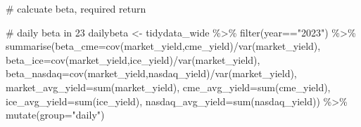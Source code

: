 \documentclass[
  letterpaper,
  DIV=11,
  numbers=noendperiod]{scrreprt}
\newenvironment{Shaded}{\begin{snugshade}}{\end{snugshade}}
\newcommand{\AttributeTok}[1]{\textcolor[rgb]{0.40,0.45,0.13}{#1}}
\newcommand{\CommentTok}[1]{\textcolor[rgb]{0.37,0.37,0.37}{#1}}
\newcommand{\FunctionTok}[1]{\textcolor[rgb]{0.28,0.35,0.67}{#1}}
\newcommand{\NormalTok}[1]{\textcolor[rgb]{0.00,0.23,0.31}{#1}}
\newcommand{\OtherTok}[1]{\textcolor[rgb]{0.00,0.23,0.31}{#1}}
\newcommand{\SpecialCharTok}[1]{\textcolor[rgb]{0.37,0.37,0.37}{#1}}
\newcommand{\StringTok}[1]{\textcolor[rgb]{0.13,0.47,0.30}{#1}}
\begin{document}
\begin{Shaded}
\begin{Highlighting}[]
\CommentTok{\# calcuate beta, required return}

\CommentTok{\# daily beta in \textquotesingle{}23}
\NormalTok{dailybeta }\OtherTok{\textless{}{-}}\NormalTok{ tidydata\_wide }\SpecialCharTok{\%\textgreater{}\%} 
  \FunctionTok{filter}\NormalTok{(year}\SpecialCharTok{==}\StringTok{"2023"}\NormalTok{) }\SpecialCharTok{\%\textgreater{}\%} 
  \FunctionTok{summarise}\NormalTok{(}\AttributeTok{beta\_cme=}\FunctionTok{cov}\NormalTok{(market\_yield,cme\_yield)}\SpecialCharTok{/}\FunctionTok{var}\NormalTok{(market\_yield),}
            \AttributeTok{beta\_ice=}\FunctionTok{cov}\NormalTok{(market\_yield,ice\_yield)}\SpecialCharTok{/}\FunctionTok{var}\NormalTok{(market\_yield),}
            \AttributeTok{beta\_nasdaq=}\FunctionTok{cov}\NormalTok{(market\_yield,nasdaq\_yield)}\SpecialCharTok{/}\FunctionTok{var}\NormalTok{(market\_yield),}
            \AttributeTok{market\_avg\_yield=}\FunctionTok{sum}\NormalTok{(market\_yield),}
            \AttributeTok{cme\_avg\_yield=}\FunctionTok{sum}\NormalTok{(cme\_yield),}
            \AttributeTok{ice\_avg\_yield=}\FunctionTok{sum}\NormalTok{(ice\_yield),}
            \AttributeTok{nasdaq\_avg\_yield=}\FunctionTok{sum}\NormalTok{(nasdaq\_yield)) }\SpecialCharTok{\%\textgreater{}\%} 
  \FunctionTok{mutate}\NormalTok{(}\AttributeTok{group=}\StringTok{"daily"}\NormalTok{)}


\end{Highlighting}
\end{Shaded}
\end{document}
